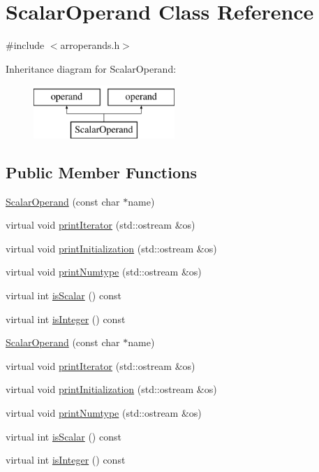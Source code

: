 \hypertarget{classScalarOperand}{}\section{Scalar\+Operand Class Reference}
\label{classScalarOperand}


{\ttfamily \#include $<$arroperands.\+h$>$}

Inheritance diagram for Scalar\+Operand\+:\begin{figure}[H]
\begin{center}
\leavevmode
\includegraphics[height=2.000000cm]{classScalarOperand}
\end{center}
\end{figure}
\subsection*{Public Member Functions}
\begin{DoxyCompactItemize}
\item 
\hyperlink{classScalarOperand_ad354927eeea7602ad02c30668a7f9449}{Scalar\+Operand} (const char $\ast$name)
\item 
virtual void \hyperlink{classScalarOperand_ae1a96a26dfb5d20529cb4b227476657b}{print\+Iterator} (std\+::ostream \&os)
\item 
virtual void \hyperlink{classScalarOperand_ad84e8cea926f1ac5366083f2b613113b}{print\+Initialization} (std\+::ostream \&os)
\item 
virtual void \hyperlink{classScalarOperand_a28eb34aa217e0ddce04722b2d61a09bd}{print\+Numtype} (std\+::ostream \&os)
\item 
virtual int \hyperlink{classScalarOperand_afb0eb803204c5743ceafd6eae7e4e56e}{is\+Scalar} () const 
\item 
virtual int \hyperlink{classScalarOperand_aa4fe62b07d50b55626aaba96b2955e61}{is\+Integer} () const 
\item 
\hyperlink{classScalarOperand_ad354927eeea7602ad02c30668a7f9449}{Scalar\+Operand} (const char $\ast$name)
\item 
virtual void \hyperlink{classScalarOperand_ae1a96a26dfb5d20529cb4b227476657b}{print\+Iterator} (std\+::ostream \&os)
\item 
virtual void \hyperlink{classScalarOperand_ad84e8cea926f1ac5366083f2b613113b}{print\+Initialization} (std\+::ostream \&os)
\item 
virtual void \hyperlink{classScalarOperand_a28eb34aa217e0ddce04722b2d61a09bd}{print\+Numtype} (std\+::ostream \&os)
\item 
virtual int \hyperlink{classScalarOperand_afb0eb803204c5743ceafd6eae7e4e56e}{is\+Scalar} () const 
\item 
virtual int \hyperlink{classScalarOperand_aa4fe62b07d50b55626aaba96b2955e61}{is\+Integer} () const 
\end{DoxyCompactItemize}
